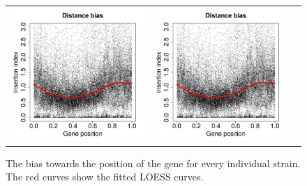 \documentclass[a4paper,10pt, twocolumn]{article}
\begin{document}
\begin{figure}
\begin{tabular}{c c c}
\includegraphics[page=22, scale=0.22]{biases-without-ends.pdf} &
\includegraphics[page=24, scale=0.22]{biases-without-ends.pdf}
\end{tabular}
\caption{The bias towards the position of the gene for every individual strain. The red curves show the fitted LOESS curves.}
\label{fig:distance_bias_individual}
\end{figure}
\end{document}
